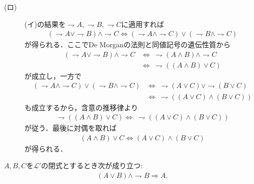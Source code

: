 \begin{prf}
\begin{description}
			\item[(ロ)]
				(イ)の結果を$\rightharpoondown A,\rightharpoondown B,\rightharpoondown C$に適用すれば
				\begin{align}
					(\rightharpoondown A \vee \rightharpoondown B) \wedge \rightharpoondown C
					\Longleftrightarrow (\rightharpoondown A \wedge \rightharpoondown C) 
						\vee (\rightharpoondown B \wedge \rightharpoondown C)
				\end{align}
				が得られる．ここでDe Morganの法則と同値記号の遺伝性質から
				\begin{align}
					(\rightharpoondown A \vee \rightharpoondown B) \wedge \rightharpoondown C
					&\Longleftrightarrow\ \rightharpoondown (A \wedge B) \wedge \rightharpoondown C \\
					&\Longleftrightarrow\ \rightharpoondown ((A \wedge B) \vee C)
				\end{align}
				が成立し，一方で
				\begin{align}
					(\rightharpoondown A \wedge \rightharpoondown C) 
						\vee (\rightharpoondown B \wedge \rightharpoondown C)
					&\Longleftrightarrow\ \rightharpoondown (A \vee C) \vee \rightharpoondown (B \vee C) \\
					&\Longleftrightarrow\ \rightharpoondown ((A \vee C) \wedge (B \vee C))
				\end{align}
				も成立するから，含意の推移律より
				\begin{align}
					\rightharpoondown ((A \wedge B) \vee C)
					\Longleftrightarrow\ \rightharpoondown ((A \vee C) \wedge (B \vee C))
				\end{align}
				が従う．最後に対偶を取れば
				\begin{align}
					(A \wedge B) \vee C \Longleftrightarrow (A \vee C) \wedge (B \vee C)
				\end{align}
				が得られる．
				\QED
		\end{description}
	\end{prf}
	
	\begin{screen}
		\begin{logicalthm}[選言三段論法]\label{logicalthm:disjunctive_syllogism}
			$A,B,C$を$\mathcal{L}'$の閉式とするとき次が成り立つ:
			\begin{align}
				(A \vee B) \wedge \rightharpoondown B \Longrightarrow A.
			\end{align}
		\end{logicalthm}
	\end{screen}
	

